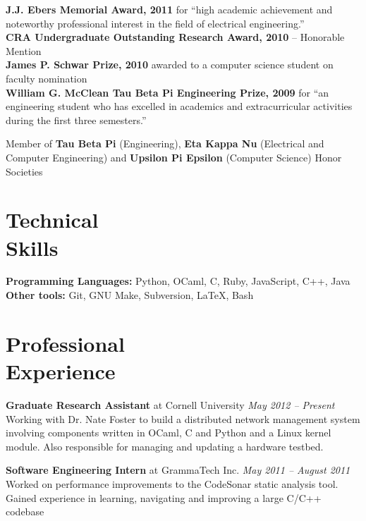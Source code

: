\documentclass[margin,line]{resume}
\begin{document}
\begin{resume}
    {\bf J.J. Ebers Memorial Award, 2011} for ``high academic achievement and
    noteworthy professional interest in the field of electrical engineering.''\\
    {\bf CRA Undergraduate Outstanding Research Award, 2010} -- Honorable
    Mention \\
    {\bf James P. Schwar Prize, 2010} awarded to a computer science student on
    faculty nomination \\
    {\bf William G. McClean Tau Beta Pi Engineering Prize, 2009} for ``an
    engineering student who has excelled in academics and extracurricular
    activities during the first three semesters.''

    Member of {\bf Tau Beta Pi} (Engineering), {\bf Eta Kappa Nu} (Electrical
    and Computer Engineering) and {\bf Upsilon Pi Epsilon} (Computer Science)
    Honor Societies

    \section{Technical\\ Skills}

    {\bf Programming Languages:} Python, OCaml, C, Ruby, JavaScript, C++, Java\\
    {\bf Other tools:} Git, GNU Make, Subversion, \LaTeX, Bash

    \section{Professional\\Experience}

    {\bf Graduate Research Assistant} at Cornell University \hfill
    {\it May 2012 -- Present} \\
    Working with Dr. Nate Foster to build a distributed network management
    system involving components written in OCaml, C and Python and a Linux
    kernel module. Also responsible for managing and updating a hardware testbed.

    {\bf Software Engineering Intern} at GrammaTech Inc. \hfill
    {\it May 2011 -- August 2011} \\
    Worked on performance improvements to the CodeSonar static analysis tool.
    Gained experience in learning, navigating and improving a large C/C++
    codebase


\end{resume}
\end{document}
